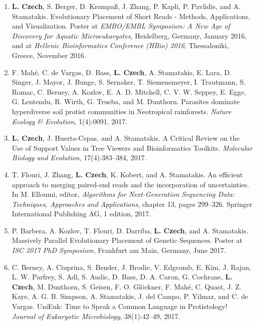 \begin{enumerate}
    \item \textbf{L. Czech}, S. Berger, D. Krompaß, J. Zhang, P. Kapli, P. Pavlidis, and A. Stamatakis.
        Evolutionary Placement of Short Reads - Methods, Applications, and Visualization.
        Poster at \textit{EMBO/EMBL Symposium: A New Age of Discovery for Aquatic Microeukaryotes}, Heidelberg, Germany, January 2016,
        and at \textit{Hellenic Bioinformatics Conference (HBio) 2016}, Thessaloniki, Greece, November 2016.

    \item F. Mah{\'{e}}, C. de Vargas, D. Bass, \textbf{L. Czech}, A. Stamatakis, E. Lara, D. Singer, J. Mayor, J. Bunge,
        S. Sernaker, T. Siemensmeyer, I. Trautmann, S. Romac, C. Berney, A. Kozlov, E. A. D. Mitchell, C. V. W. Seppey,
        E. Egge, G. Lentendu, R. Wirth, G. Trueba, and M. Dunthorn.
        Parasites dominate hyperdiverse soil protist communities in Neotropical rainforests.
        \textit{Nature Ecology \& Evolution}, 1(4):0091, 2017. %

    \item \textbf{L. Czech}, J. Huerta-Cepas, and A. Stamatakis.
        A Critical Review on the Use of Support Values in Tree Viewers and Bioinformatics Toolkits.
        \textit{Molecular Biology and Evolution}, 17(4):383--384, 2017. %

    \item T. Flouri, J. Zhang, \textbf{L. Czech}, K. Kobert, and A. Stamatakis.
        An efficient approach to merging paired-end reads and the incorporation of uncertainties.
        In M. Elloumi, editor, \textit{Algorithms for Next-Generation Sequencing Data: Techniques, Approaches and Applications},
        chapter 13, pages 299--326. Springer International Publishing AG, 1 edition, 2017. %

    \item P. Barbera, A. Kozlov, T. Flouri, D. Darriba, \textbf{L. Czech}, and A. Stamatakis.
        Massively Parallel Evolutionary Placement of Genetic Sequences.
        Poster at \textit{ISC 2017 PhD Symposium}, Frankfurt am Main, Germany, June 2017.

    \item C. Berney, A. Ciuprina, S. Bender, J. Brodie, V. Edgcomb, E. Kim, J. Rajan, L. W. Parfrey, S. Adl, S. Audic,
        D. Bass, D. A. Caron, G. Cochrane, \textbf{L. Czech}, M. Dunthorn, S. Geisen, F. O. Glöckner, F. Mah{\'{e}}, C. Quast,
        J. Z. Kaye, A. G. B. Simpson, A. Stamatakis, J. del Campo, P. Yilmaz, and C. de Vargas.
        UniEuk: Time to Speak a Common Language in Protistology!
        \textit{Journal of Eukaryotic Microbiology}, 38(1):42--49, 2017. %


\end{enumerate}

